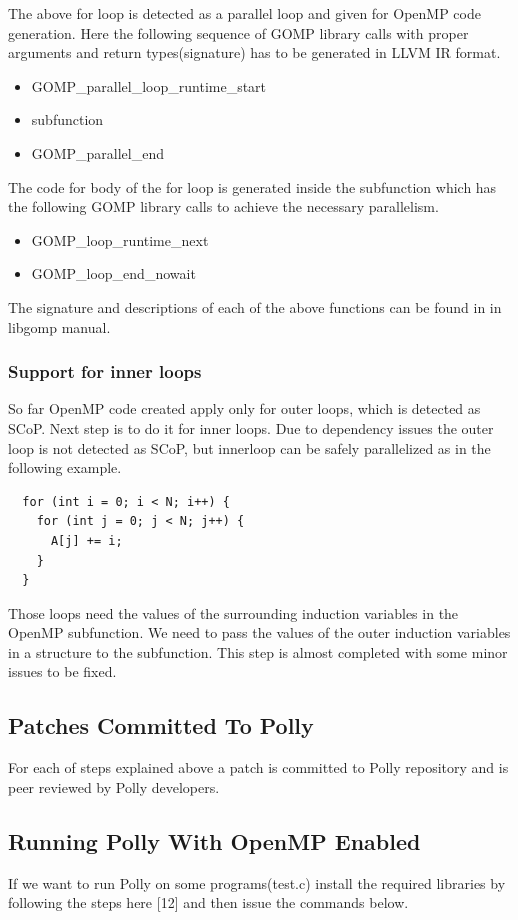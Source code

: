 \documentclass[a4paper,10pt]{article}
\begin{document}
The above for loop is detected as a parallel loop and given for OpenMP code
generation. Here the following sequence of GOMP library calls with proper arguments and return types(signature)
has to be generated in LLVM IR format\cite{kaleid}.

{\small
\begin{itemize}
\item GOMP\_parallel\_loop\_runtime\_start
\item subfunction
\item GOMP\_parallel\_end
\end{itemize}
}
The code for body of the for loop is generated inside the subfunction which has
the following GOMP library calls to achieve the necessary parallelism.
{\small
\begin{itemize}
\item GOMP\_loop\_runtime\_next
\item GOMP\_loop\_end\_nowait
\end{itemize}
}
The signature and descriptions of each of the above functions can be 
found in in libgomp manual\cite{libgomp}.

\subsubsection{Support for inner loops}
So far OpenMP code created apply only for outer loops, which is detected as SCoP.
Next step is to do it for inner loops. Due to dependency issues the
outer loop is not detected as SCoP, but innerloop can be safely parallelized as
in the following example.
{\footnotesize
\begin{lstlisting}
  for (int i = 0; i < N; i++) {
    for (int j = 0; j < N; j++) {
      A[j] += i;
    }
  }
\end{lstlisting}
}
Those loops need the values of the surrounding induction variables in the 
OpenMP subfunction. We need to pass the values of the outer induction 
variables in a structure to the subfunction. This step is almost completed with some minor issues to be fixed.

\subsection{Patches Committed To Polly}
For each of steps explained above a patch is committed to Polly repository and is
peer reviewed by Polly developers.
\subsection{Running Polly With OpenMP Enabled}
If we want to run Polly on some programs(test.c) install the required libraries by
following the steps here [12] and then issue the commands below.
\end{document}
